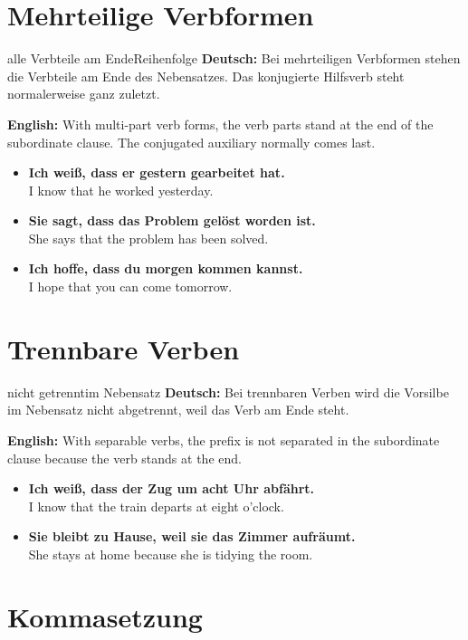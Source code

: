 \documentclass[a4paper,11pt]{article}
\newcommand{\GermanText}[1]{\textbf{Deutsch: }#1\par}
\newcommand{\EnglishText}[1]{{\small\color{SoftGray}\textbf{English: }#1\par}}
\newcommand{\ExampleItem}[2]{\item \textbf{#1}\\{\small\color{SoftGray}#2}}
\begin{document}
\section{Mehrteilige Verbformen}

\begin{grammarentry}{alle Verbteile am Ende}{Reihenfolge}
\GermanText{Bei mehrteiligen Verbformen stehen die Verbteile am Ende des Nebensatzes. Das konjugierte Hilfsverb steht normalerweise ganz zuletzt.}
\EnglishText{With multi-part verb forms, the verb parts stand at the end of the subordinate clause. The conjugated auxiliary normally comes last.}
\end{grammarentry}

\begin{exbox}
\begin{itemize}
\ExampleItem{Ich weiß, dass er gestern gearbeitet hat.}{I know that he worked yesterday.}
\ExampleItem{Sie sagt, dass das Problem gelöst worden ist.}{She says that the problem has been solved.}
\ExampleItem{Ich hoffe, dass du morgen kommen kannst.}{I hope that you can come tomorrow.}
\end{itemize}
\end{exbox}

\section{Trennbare Verben}

\begin{grammarentry}{nicht getrennt}{im Nebensatz}
\GermanText{Bei trennbaren Verben wird die Vorsilbe im Nebensatz nicht abgetrennt, weil das Verb am Ende steht.}
\EnglishText{With separable verbs, the prefix is not separated in the subordinate clause because the verb stands at the end.}
\end{grammarentry}

\begin{exbox}
\begin{itemize}
\ExampleItem{Ich weiß, dass der Zug um acht Uhr abfährt.}{I know that the train departs at eight o'clock.}
\ExampleItem{Sie bleibt zu Hause, weil sie das Zimmer aufräumt.}{She stays at home because she is tidying the room.}
\end{itemize}
\end{exbox}

\section{Kommasetzung}
\end{document}
